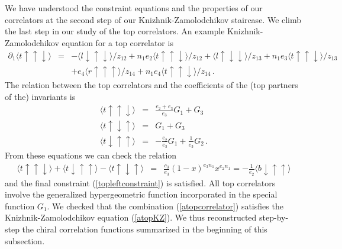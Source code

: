 \documentclass[12pt]{article}
\numberwithin{equation}{section}
\numberwithin{equation}{section}
\numberwithin{table}{section}\setlength{\multlinegap}{25pt}
\begin{document}
We have understood the constraint equations and the properties of our correlators at the second step
of our Knizhnik-Zamolodchikov staircase. We climb the last step in our study of the 
top correlators. An example Knizhnik-Zamolodchikov equation for a top correlator is
\begin{eqnarray}
\partial_1 \langle t\uparrow \uparrow \downarrow \rangle &=& -\langle l \downarrow \uparrow \downarrow \rangle/z_{12} + n_1 e_2\langle t\uparrow \uparrow \downarrow \rangle/z_{12}
+\langle l \uparrow \downarrow \downarrow \rangle/z_{13} + n_1 e_3\langle t\uparrow \uparrow \downarrow \rangle/z_{13} \nonumber \\
& & + e_4\langle r\uparrow \uparrow \uparrow \rangle/z_{14} + n_1 e_4\langle t\uparrow \uparrow \downarrow \rangle/z_{14} \, .
\label{atopKZ}
\end{eqnarray} 
The relation between the top correlators and the coefficients of the (top partners of the)
invariants is
\begin{eqnarray}
 \langle t\uparrow \uparrow \downarrow \rangle &=& \frac{e_2+e_3}{e_3} G_1 + G_3
 \label{atopcorrelator} \\
 \langle t \uparrow \downarrow \uparrow  \rangle&=& G_1 + G_3
\nonumber \\
 \langle t \downarrow \uparrow \uparrow \rangle &=& - \frac{e_2}{e_3} G_1 + \frac{1}{e_3} G_2 \nonumber
\, .
\end{eqnarray}
{From} these equations we can check  the relation
\begin{eqnarray}
\langle t\uparrow \uparrow \downarrow  \rangle+\langle t \downarrow \uparrow \uparrow  \rangle-\langle t \uparrow \downarrow \uparrow   \rangle&=& 
\frac{c_3}{e_3} (1 - x)^{e_3 n_1} x^{e_2 n_1} = -\frac{1}{e_2} \langle b \downarrow \uparrow \uparrow   \rangle
\end{eqnarray}
and the final constraint (\ref{topleftconstraint}) is satisfied. All top correlators involve the generalized hypergeometric
function incorporated in the special function $G_1$. We checked that the combination (\ref{atopcorrelator}) satisfies the
Knizhnik-Zamolodchikov equation (\ref{atopKZ}). We thus reconstructed step-by-step the chiral correlation functions 
summarized in the beginning of this subsection.
\end{document}
